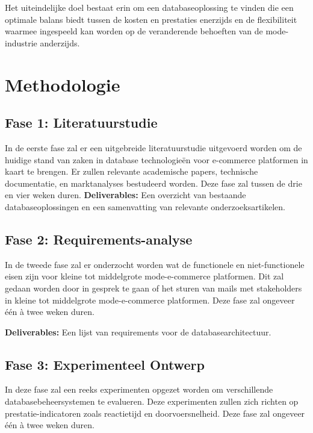 Het uiteindelijke doel bestaat erin om een databaseoplossing te vinden die een optimale balans biedt
tussen de kosten en prestaties enerzijds en de flexibiliteit waarmee ingespeeld kan worden op de
veranderende behoeften van de mode-industrie anderzijds.




\section{Methodologie}
\label{sec:methodologie}

\subsection{Fase 1: Literatuurstudie}
\label{subsec:literatuurstudie}
In de eerste fase zal er een uitgebreide literatuurstudie uitgevoerd worden om de huidige stand van zaken in database technologieën voor e-commerce platformen in kaart te brengen. Er zullen relevante academische papers, technische documentatie, en marktanalyses bestudeerd worden. Deze fase zal tussen de drie en vier weken duren.
\textbf{Deliverables:} Een overzicht van bestaande databaseoplossingen en een samenvatting van relevante onderzoeksartikelen.

\subsection{Fase 2: Requirements-analyse}
\label{subsec:requirementsanalyse}
In de tweede fase zal er onderzocht worden wat de functionele en niet-functionele eisen zijn voor kleine tot middelgrote mode-e-commerce platformen. Dit zal gedaan worden door in gesprek te gaan of het sturen van mails met stakeholders in kleine tot middelgrote mode-e-commerce platformen. Deze fase zal ongeveer één à twee weken duren.

\textbf{Deliverables:} Een lijst van requirements voor de databasearchitectuur.

\subsection{Fase 3: Experimenteel Ontwerp}
\label{subsec:experimenteelontwerp}
In deze fase zal een reeks experimenten opgezet worden om verschillende databasebeheersystemen te evalueren. Deze experimenten zullen zich richten op prestatie-indicatoren zoals reactietijd en doorvoersnelheid. Deze fase zal ongeveer één à twee weken duren.

